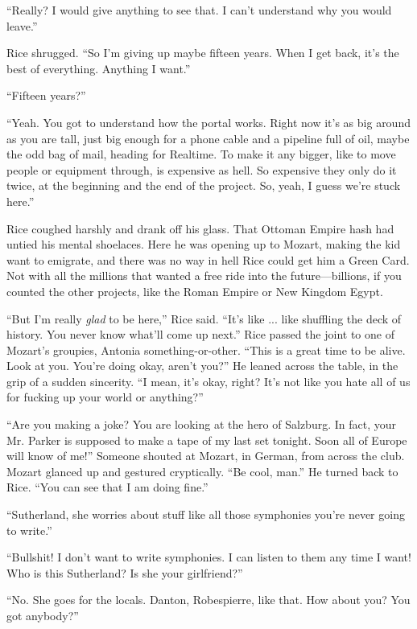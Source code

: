 ``Really? I would give anything to see that. I can't understand why you would leave.''

Rice shrugged. ``So I'm giving up maybe fifteen years. When I get back, it's the best of everything. Anything I want.''

``Fifteen years?''

``Yeah. You got to understand how the portal works. Right now it's as big around as you are tall, just big enough for a phone cable and a pipeline full of oil, maybe the odd bag of mail, heading for Realtime. To make it any bigger, like to move people or equipment through, is expensive as hell. So expensive they only do it twice, at the beginning and the end of the project. So, yeah, I guess we're stuck here.''

Rice coughed harshly and drank off his glass. That Ottoman Empire hash had untied his mental shoelaces. Here he was opening up to Mozart, making the kid want to emigrate, and there was no way in hell Rice could get him a Green Card. Not with all the millions that wanted a free ride into the future—billions, if you counted the other projects, like the Roman Empire or New Kingdom Egypt.

``But I'm really \textit{glad} to be here,'' Rice said. ``It's like ... like shuffling the deck of history. You never know what'll come up next.'' Rice passed the joint to one of Mozart's groupies, Antonia something-or-other. ``This is a great time to be alive. Look at you. You're doing okay, aren't you?'' He leaned across the table, in the grip of a sudden sincerity. ``I mean, it's okay, right? It's not like you hate all of us for fucking up your world or anything?''

``Are you making a joke? You are looking at the hero of Salzburg. In fact, your Mr. Parker is supposed to make a tape of my last set tonight. Soon all of Europe will know of me!'' Someone shouted at Mozart, in German, from across the club. Mozart glanced up and gestured cryptically. ``Be cool, man.'' He turned back to Rice. ``You can see that I am doing fine.''

``Sutherland, she worries about stuff like all those symphonies you're never going to write.''

``Bullshit! I don't want to write symphonies. I can listen to them any time I want! Who is this Sutherland? Is she your girlfriend?''

``No. She goes for the locals. Danton, Robespierre, like that. How about you? You got anybody?''

